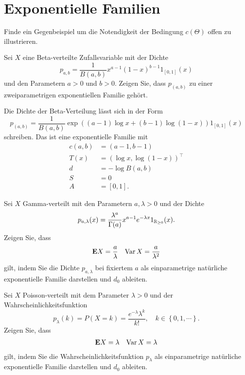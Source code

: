 \section{Exponentielle Familien}


Finde ein Gegenbeispiel um die Notendigkeit der Bedingung $c(\Theta)$ offen zu
illustrieren. 


Sei $X$ eine Beta-verteilte Zufallsvariable mit der Dichte
\begin{equation*}
    p_{a,b} = \frac{1}{B(a,b)} x^{a-1} (1-x)^{b-1} 1_{[0,1]}(x)
\end{equation*}
und den Parametern $a>0$ und $b>0$.
Zeigen Sie, dass $p_{(a,b)}$ zu einer zweiparametrigen exponentiellen
Familie gehört.

\solution Die Dichte der Beta-Verteilung lässt sich in der Form
\begin{equation*}
    p_{(a,b)} = \frac{1}{B(a,b)} \exp \left( 
        (a-1) \log x + (b-1) \log (1-x) 
        \right) 1_{[0,1]}(x)
\end{equation*}
schreiben. Das ist eine exponentielle Familie mit 
\begin{align*}
    c(a,b) &= \left( a-1, b-1 \right) \\
    T(x) &= \left( \log x, \log (1-x) \right)^\top \\
    d &= - \log B(a,b) \\
    S &= 0 \\
    A &= [0,1].
\end{align*}


Sei $X$ Gamma-verteilt mit den Parametern $a,\lambda>0$ und der Dichte
\begin{equation*}
    p_{a,\lambda} (x) = \frac{\lambda^a}{\Gamma(a)} x^{a-1} e^{-\lambda x} 1_{\mathbb R_{\geq 0}} (x).
\end{equation*}
Zeigen Sie, dass 
\begin{align*}
    \mathbf{E} X = \frac{a}{\lambda} && \operatorname{Var} X = \frac{a}{\lambda^2} 
\end{align*}
gilt, indem Sie die Dichte $p_{a,\lambda}$ bei fixiertem $a$ als einparametrige
natürliche exponentielle Familie darstellen und $d_0$ ableiten. 


Sei $X$ Poisson-verteilt mit dem Parameter $\lambda>0$ und der Wahrscheinlichkeitsfunktion
\begin{equation*}
    p_{\lambda}(k)= P(X=k) = 
    \frac{e^{-\lambda} \lambda^{k} }{k!}, \quad k\in \left\{ 0,1,\cdots \right\}.
\end{equation*}
Zeigen Sie, dass 
\begin{align*}
    \mathbf{E} X = \lambda && \operatorname{Var} X = \lambda 
\end{align*}
gilt, indem Sie die Wahrscheinlichkeitsfunktion $p_{\lambda}$ 
als einparametrige natürliche exponentielle Familie darstellen und $d_0$ ableiten. 


